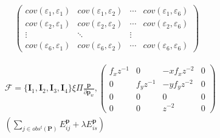 \documentclass{article}
\begin{document}
\begin{CJK*}{GBK}{song}
\begin{equation}\left.\begin{aligned}
\begin{pmatrix}
cov(\varepsilon_1,\varepsilon_1) &cov(\varepsilon_1,\varepsilon_2)&\cdots&cov(\varepsilon_1,\varepsilon_6)
\\cov(\varepsilon_2,\varepsilon_1)&cov(\varepsilon_2,\varepsilon_2)&\cdots&cov(\varepsilon_2,\varepsilon_6)
\\ \vdots & \ddots  &\vdots
\\cov(\varepsilon_6,\varepsilon_1)&cov(\varepsilon_6,\varepsilon_2)&\cdots&cov(\varepsilon_6,\varepsilon_6)
\end{pmatrix}
\end{aligned}\tag{3.4}\right.\end{equation}


\begin{equation}\left.\begin{aligned}
&
\boldsymbol{\mathcal{F}}=\{\boldsymbol{I}_{1},\boldsymbol{I}_{2},\boldsymbol{I}_{3},\boldsymbol{I}_{4}\}
\xi\Pi
\frac{\textbf{p}}{\partial{\textbf{p}_w}},
\begin{pmatrix}f_xz^{-1}&0&-xf_xz^{-2}&0\\0&f_yz^{-1}&-yf_yz^{-2}&0\\0&0&0&0\\0&0&z^{-2}&0\end{pmatrix}
\\&
(\sum\limits_{j\in{obs^t(\textbf{P})}}E_{ij}^{\textbf{p}}+\lambda E_{is}^{\textbf{p}})
\end{aligned}\tag{3.4}\right.\end{equation}


\end{CJK*}
\end{document}
